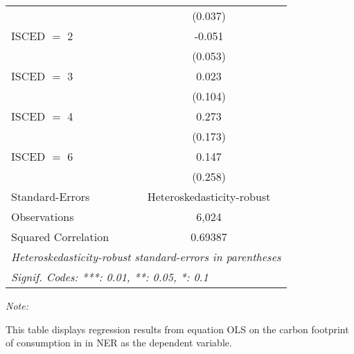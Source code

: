 \begin{table}[htbp!]
\begin{adjustbox}{width = 1\textwidth, max height = 0.95\textheight, center}
\begin{threeparttable}[b]
\begin{tabular}{lc}
                                & (0.037)\\   
            ISCED $=$ 2         & -0.051\\   
                                & (0.053)\\   
            ISCED $=$ 3         & 0.023\\   
                                & (0.104)\\   
            ISCED $=$ 4         & 0.273\\   
                                & (0.173)\\   
            ISCED $=$ 6         & 0.147\\   
                                & (0.258)\\   
            \midrule 
            Standard-Errors     & Heteroskedasticity-robust \\   
            Observations        & 6,024\\  
            Squared Correlation & 0.69387\\  
            \midrule \midrule
            \multicolumn{2}{l}{\emph{Heteroskedasticity-robust standard-errors in parentheses}}\\
            \multicolumn{2}{l}{\emph{Signif. Codes: ***: 0.01, **: 0.05, *: 0.1}}\\
         \end{tabular}
         
         \begin{tablenotes}\item \medskip \textit{Note:}
            \item This table displays regression results from equation OLS on the carbon footprint of consumption in  in NER as the dependent variable.  
         \end{tablenotes}
      \end{threeparttable}
   \end{adjustbox}
\end{table}


